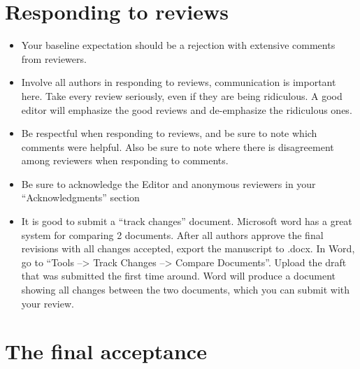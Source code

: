 \documentclass[
  letterpaper,
  DIV=11,
  numbers=noendperiod]{scrreprt}
\begin{document}
\hypertarget{responding-to-reviews}{%
\section*{\texorpdfstring{\textbf{Responding to
reviews}}{Responding to reviews}}\label{responding-to-reviews}}


\begin{itemize}
\item
  Your baseline expectation should be a rejection with extensive
  comments from reviewers.
\item
  Involve all authors in responding to reviews, communication is
  important here. Take every review seriously, even if they are being
  ridiculous. A good editor will emphasize the good reviews and
  de-emphasize the ridiculous ones.
\item
  Be respectful when responding to reviews, and be sure to note which
  comments were helpful. Also be sure to note where there is
  disagreement among reviewers when responding to comments.
\item
  Be sure to acknowledge the Editor and anonymous reviewers in your
  ``Acknowledgments'' section
\item
  It is good to submit a ``track changes'' document. Microsoft word has
  a great system for comparing 2 documents. After all authors approve
  the final revisions with all changes accepted, export the manuscript
  to .docx. In Word, go to ``Tools --\textgreater{} Track Changes
  --\textgreater{} Compare Documents''. Upload the draft that was
  submitted the first time around. Word will produce a document showing
  all changes between the two documents, which you can submit with your
  review.
\end{itemize}

\hypertarget{the-final-acceptance}{%
\section*{\texorpdfstring{\textbf{The final
acceptance}}{The final acceptance}}\label{the-final-acceptance}}

\end{document}
